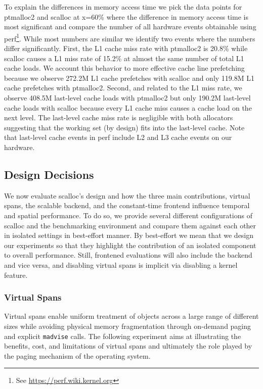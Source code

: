 \documentclass[10pt]{sigplanconf}
\newcommand{\impl}[1]{{\tt #1}\xspace}
\begin{document}
To explain the differences in memory access time we pick the data points for
ptmalloc2 and scalloc at x=60\% where the difference in memory access time is
most significant and compare the number of all hardware events obtainable using
perf\footnote{See \url{https://perf.wiki.kernel.org}}. While most numbers are similar we
identify  two events where the numbers differ significantly. First, the L1 cache
miss  rate with ptmalloc2 is 20.8\% while scalloc causes a L1 miss rate of
15.2\% at almost the same number of total L1 cache loads. We account this
behavior to more effective cache line prefetching because we observe 272.2M L1
cache prefetches with scalloc and only 119.8M L1 cache prefetches with
ptmalloc2. Second, and related to the L1 miss rate, we observe 408.5M last-level
cache loads with ptmalloc2 but only 190.2M last-level cache loads with scalloc
because every L1 cache miss causes a cache load on the next level. The
last-level cache miss rate is negligible with both allocators suggesting that
the working set (by design) fits into the last-level cache. Note that
last-level cache events in perf include L2 and L3 cache events on our hardware.



\subsection{Design Decisions}\label{sec:scallocs-contributions}

We now evaluate scalloc's design and how the three main contributions, virtual
spans, the scalable backend, and the constant-time frontend influence temporal
and spatial performance. To do so, we provide several different configurations
of scalloc and the benchmarking environment and compare them against each
other in isolated settings in best-effort manner. By best-effort we mean that 
we design our experiments so that they highlight the contribution of an isolated component to
overall performance. Still, frontened evaluations will also include the backend and vice versa, and disabling virtual spans 
is implicit via disabling a kernel feature. 

\subsubsection*{Virtual Spans}

Virtual spans enable uniform treatment of objects across a large range
of different sizes while avoiding physical memory fragmentation through
on-demand paging and explicit \impl{madvise} calls.
The following experiment aims at illustrating
the benefits, cost, and limitations of virtual spans and
ultimately the role played by the paging mechanism of the operating system.
\end{document}
